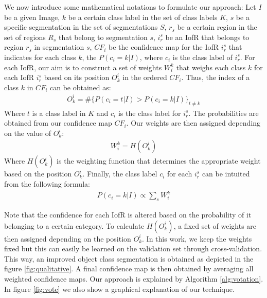 \documentclass[10pt,twocolumn,letterpaper]{article}
\begin{document}
We now introduce some mathematical notations to formulate our approach:
Let $I$ be a given Image,
$k$ be a certain class label in the set of class labels $K$,
$s$ be a specific segmentation in the set of segmentations $S$,
$r_s$ be a certain region in the set of regions $R_s$ that belong to segmentation $s$,
$i_r^s$ be an IofR that belongs to region $r_s$ in segmentation $s$,
$CF_i$ be the confidence map for the IofR $i_r^s$ that indicates for each class $k$, the $P(c_i=k|I)$, where $c_i$ is the class label of $i_r^s$.
For each IofR, our aim is to construct a set of weights $W_i^k$ that weighs each class $k$ for each IofR $i_r^s$ based on its position $O_k^i$ in the ordered $CF_i$.
Thus, the index of a class $k$ in $CF_i$ can be obtained as:
\begin{eqnarray}
O_k^i = \#\{P(c_i=t|I) > P(c_i=k|I)\}_{t\neq{k}}
\end{eqnarray}
Where $t$ is a class label in $K$ and $c_i$ is the class label for $i_r^s$. The probabilities are obtained from our confidence map $CF_i$.
Our weights are then assigned depending on the value of $O_k^i$:
\begin{eqnarray}
W_i^k = H(O_k^i)
\end{eqnarray}
Where $H(O_k^i)$ is the weighting function that determines the appropriate weight based on the position $O_k^i$.
Finally, the class label $c_i$ for each $i_r^s$ can be intuited from the following formula:
\begin{eqnarray}
P(c_i=k|I) \propto \sum_s{W_i^k}
\end{eqnarray}

Note that the confidence for each IofR is altered based on the probability of it belonging to a certain category.
To calculate $H(O_k^i)$, a fixed set of weights are then assigned depending on the position $O_k^i$.
In this work, we keep the weights fixed but this can easily be learned on the validation set through cross-validation.
This way, an improved object class segmentation is obtained as depicted in the figure \ref{fig:qualitative}.
A final confidence map is then obtained by averaging all weighted confidence maps.
Our approach is explained by Algorithm \ref{alg:votation}. In figure \ref{fig:vote} we also show a graphical explanation of our technique.
\end{document}
